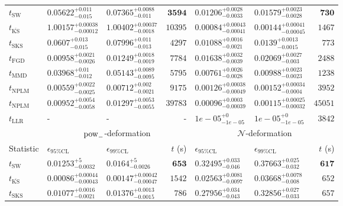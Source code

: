 \begin{tabular}{l|llr|llr}
	\midrule
	$t_{\mathrm{SW}}$ & $0.05622_{-0.015}^{+0.011}$ & $0.07365_{-0.011}^{+0.0088}$ & ${\mathbf{3594}}$ & $0.01206_{-0.0033}^{+0.0028}$ & $0.01579_{-0.0028}^{+0.0023}$ & ${\mathbf{730}}$ \\
	$t_{\overline{\mathrm{KS}}}$ & $1.00157_{-0.00012}^{+0.00038}$ & $1.00402_{-0.0018}^{+0.00037}$ & $10395$ & ${\mathbf{0.00084_{-0.00041}^{+0.00043}}}$ & ${\mathbf{0.00144_{-0.00045}^{+0.00041}}}$ & $1467$ \\
	$t_{\mathrm{SKS}}$ & $0.0607_{-0.015}^{+0.013}$ & $0.07996_{-0.013}^{+0.011}$ & $4297$ & $0.01088_{-0.0021}^{+0.0016}$ & $0.0139_{-0.0015}^{+0.0013}$ & $773$ \\
	$t_{\mathrm{FGD}}$ & ${\mathbf{0.00958_{-0.0026}^{+0.0021}}}$ & ${\mathbf{0.01249_{-0.0019}^{+0.0018}}}$ & $7784$ & $0.01638_{-0.0039}^{+0.0032}$ & $0.02069_{-0.003}^{+0.0027}$ & $2488$ \\
	$t_{\mathrm{MMD}}$ & $0.03968_{-0.012}^{+0.01}$ & $0.05143_{-0.0095}^{+0.0089}$ & $5795$ & $0.00761_{-0.0028}^{+0.0026}$ & $0.00988_{-0.0023}^{+0.0023}$ & $1238$ \\
\rowcolor{red!35}	$t_{\mathrm{NPLM}}$ & $0.00559_{-0.0025}^{+0.0022}$ & $0.00712_{-0.0021}^{+0.002}$ & $9175$ & $0.00126_{-0.00049}^{+0.00038}$ & $0.00152_{-0.0004}^{+0.00034}$ & $3952$ \\
\rowcolor{blue!35}	$t_{\mathrm{NPLM}}$ & $0.00952_{-0.0058}^{+0.0054}$ & $0.01297_{-0.0055}^{+0.0053}$ & $39783$ & $0.00096_{-0.00039}^{+0.0003}$ & $0.00115_{-0.00032}^{+0.00025}$ & $45051$ \\
	$t_{\mathrm{LLR}}$ & - & - & - & $1e-05_{-1e-05}^{+0}$ & $1e-05_{-1e-05}^{+0}$ & $3842$ \\
	\toprule
	\multicolumn{1}{c}{} & \multicolumn{3}{c}{$\rm{pow}_{-}$-deformation} & \multicolumn{3}{c}{$\mathcal{N}$-deformation} \\
	Statistic & $\epsilon_{95\%\mathrm{CL}}$ & $\epsilon_{99\%\mathrm{CL}}$ & $t$ (s) & $\epsilon_{95\%\mathrm{CL}}$ & $\epsilon_{99\%\mathrm{CL}}$ & $t$ (s) \\
	\midrule
	$t_{\mathrm{SW}}$ & $0.01253_{-0.0032}^{+5}$ & $0.0164_{-0.0026}^{+5}$ & ${\mathbf{653}}$ & $0.32495_{-0.046}^{+0.033}$ & $0.37663_{-0.032}^{+0.025}$ & ${\mathbf{617}}$ \\
	$t_{\overline{\mathrm{KS}}}$ & ${\mathbf{0.00086_{-0.00043}^{+0.00044}}}$ & ${\mathbf{0.00147_{-0.00047}^{+0.00042}}}$ & $1542$ & ${\mathbf{0.02563_{-0.0097}^{+0.0081}}}$ & ${\mathbf{0.03668_{-0.008}^{+0.0078}}}$ & $652$ \\
	$t_{\mathrm{SKS}}$ & $0.01077_{-0.0021}^{+0.0016}$ & $0.01376_{-0.0015}^{+0.0013}$ & $786$ & $0.27956_{-0.043}^{+0.034}$ & $0.32856_{-0.033}^{+0.027}$ & $657$ \\

\end{tabular}
